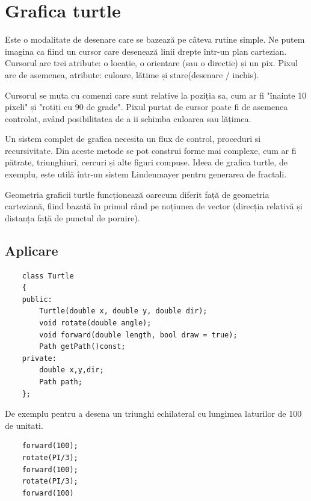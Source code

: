 \newpage
\section{Grafica turtle}

Este o modalitate de desenare care se bazează pe câteva rutine simple. Ne putem imagina ca fiind un cursor care desenează 
linii drepte într-un plan cartezian. Cursorul are trei atribute: o locație, o orientare (sau o direcție) și un pix. 
Pixul are de asemenea, atribute: culoare, lățime și stare(desenare / inchis).\newline

Cursorul se muta cu comenzi care sunt relative la poziția sa, cum ar fi "înainte 10 pixeli" și "rotiți cu 90 de grade". 
Pixul purtat de cursor poate fi de asemenea controlat, având posibilitatea de a ii schimba culoarea sau lățimea.\newline

Un sistem complet de grafica necesita un flux de control, proceduri si recursivitate. Din aceste metode se pot construi forme mai complexe, cum ar fi pătrate, triunghiuri, cercuri și alte figuri compuse. 
Ideea de grafica turtle, de exemplu, este utilă într-un sistem Lindenmayer pentru generarea de fractali.\newline

Geometria graficii turtle funcționează oarecum diferit față de geometria carteziană, 
fiind bazată în primul rând pe noțiunea de vector (direcția relativă și distanța față de punctul de pornire).\newline

\subsection{Aplicare}

\lstset{language=C++}
\begin{lstlisting}
    class Turtle
    {
    public:
        Turtle(double x, double y, double dir);
        void rotate(double angle);
        void forward(double length, bool draw = true);
        Path getPath()const;
    private:
        double x,y,dir;
        Path path;
    };
\end{lstlisting}

De exemplu pentru a desena un triunghi echilateral cu lungimea laturilor de 100 de unitati.

\lstset{language=C++}
\begin{lstlisting}
    forward(100);
    rotate(PI/3);
    forward(100);
    rotate(PI/3);
    forward(100)
\end{lstlisting}

